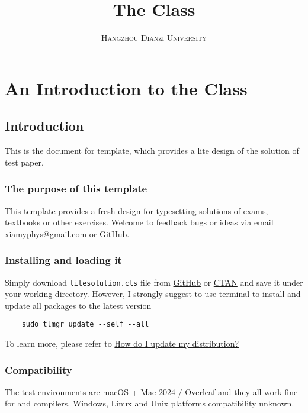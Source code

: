 \documentclass[ans,mtpro2]{litesolution}
\title{\sffamily The \pkg{LiteSolution} Class}
\subtitle{\sffamily\scshape Hangzhou Dianzi University}
\begin{document}
\maketitle


\chapter{An Introduction to the  Class}

\section{Introduction}

This is the document for  template, which provides a lite design of the solution of test paper.

\subsection{The purpose of this template}

This template provides a fresh design for typesetting solutions of exams, textbooks or other exercises. Welcome to feedback bugs or ideas via email \href{mailto:xiamyphys@gmail.com}{\ttfamily xiamyphys@gmail.com} or \href{https://github.com/xiamyphys/litesolution}{GitHub}.

\subsection{Installing  and loading it}

Simply download \verb|litesolution.cls| file from \href{https://github.com/xiamyphys/LiteSolution}{GitHub} or \href{https://ctan.org/pkg/litesolution}{CTAN} and save it under your working directory. However, I strongly suggest to use terminal to install and update all packages to the latest version

\begin{verbatim}
    sudo tlmgr update --self --all
\end{verbatim}

To learn more, please refer to \href{https://tex.stackexchange.com/questions/55437/how-do-i-update-my-tex-distribution}{How do I update my  distribution?}

\subsection{Compatibility}
The test environments are macOS + Mac 2024 / Overleaf and they all work fine for  and  compilers. Windows, Linux and Unix platforms compatibility unknown.
\end{document}
